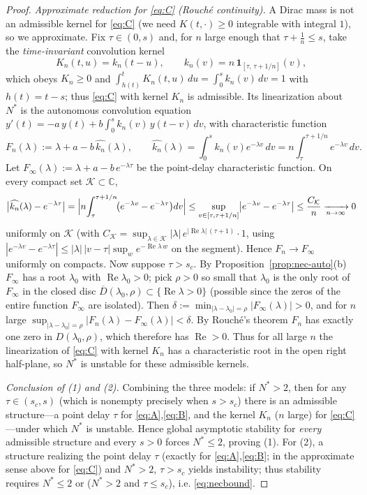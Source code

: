 \documentclass[12pt]{article}
\theoremstyle{definition}
\begin{document}
\begin{proof}
\emph{Approximate reduction for \eqref{eq:C} (Rouch\'e continuity).} A Dirac
mass is not an admissible kernel for \eqref{eq:C} (we need $K(t,\cdot)\ge0$
integrable with integral $1$), so we approximate. Fix $\tau\in(0,s)$ and, for
$n$ large enough that $\tau+\tfrac1n\le s$, take the \emph{time-invariant}
convolution kernel
\[
  K_n(t,u)=k_n(t-u),\qquad
  k_n(v)=n\,\mathbf 1_{[\tau,\,\tau+1/n]}(v),
\]
which obeys $K_n\ge0$ and $\int_{h(t)}^{t}K_n(t,u)\,du=\int_0^s k_n(v)\,dv=1$
with $h(t)=t-s$; thus \eqref{eq:C} with kernel $K_n$ is admissible. Its
linearization about $N^*$ is the autonomous convolution equation
$y'(t)=-a\,y(t)+b\!\int_0^s k_n(v)\,y(t-v)\,dv$, with characteristic function
\[
  F_n(\lambda):=\lambda+a-b\,\widehat{k_n}(\lambda),\qquad
  \widehat{k_n}(\lambda)=\int_0^s k_n(v)e^{-\lambda v}\,dv
  =n\!\int_{\tau}^{\tau+1/n}\! e^{-\lambda v}\,dv .
\]
Let $F_\infty(\lambda):=\lambda+a-b\,e^{-\lambda\tau}$ be the point-delay
characteristic function. On every compact set $\mathcal K\subset\mathbb C$,
\[
  \bigl|\widehat{k_n}(\lambda)-e^{-\lambda\tau}\bigr|
  =\Bigl|n\!\int_{\tau}^{\tau+1/n}\!\bigl(e^{-\lambda v}-e^{-\lambda\tau}\bigr)dv\Bigr|
  \le \sup_{v\in[\tau,\tau+1/n]}\bigl|e^{-\lambda v}-e^{-\lambda\tau}\bigr|
  \le \frac{C_{\mathcal K}}{n}\xrightarrow[n\to\infty]{}0
\]
uniformly on $\mathcal K$ (with $C_{\mathcal K}=\sup_{\lambda\in\mathcal K}
|\lambda|\,e^{|\operatorname{Re}\lambda|\,(\tau+1)}\cdot 1$, using
$|e^{-\lambda v}-e^{-\lambda\tau}|\le|\lambda|\,|v-\tau|\sup_{w}e^{-\operatorname{Re}\lambda\,w}$
on the segment). Hence $F_n\to F_\infty$ uniformly on compacts. Now suppose
$\tau>s_c$. By Proposition~\ref{prop:nec-auto}(b) $F_\infty$ has a root
$\lambda_0$ with $\operatorname{Re}\lambda_0>0$; pick $\rho>0$ so small that
$\lambda_0$ is the only root of $F_\infty$ in the closed disc
$\overline{D}(\lambda_0,\rho)\subset\{\operatorname{Re}\lambda>0\}$ (possible
since the zeros of the entire function $F_\infty$ are isolated). Then
$\delta:=\min_{|\lambda-\lambda_0|=\rho}|F_\infty(\lambda)|>0$, and for $n$ large
$\sup_{|\lambda-\lambda_0|=\rho}|F_n(\lambda)-F_\infty(\lambda)|<\delta$. By
Rouch\'e's theorem $F_n$ has exactly one zero in $D(\lambda_0,\rho)$, which
therefore has $\operatorname{Re}>0$. Thus for all large $n$ the linearization of
\eqref{eq:C} with kernel $K_n$ has a characteristic root in the open right
half-plane, so $N^*$ is unstable for these admissible kernels.

\emph{Conclusion of (1) and (2).} Combining the three models: if $N^*>2$, then
for any $\tau\in(s_c,s)$ (which is nonempty precisely when $s>s_c$) there is an
admissible structure—a point delay $\tau$ for \eqref{eq:A},\eqref{eq:B}, and the
kernel $K_n$ ($n$ large) for \eqref{eq:C}—under which $N^*$ is unstable. Hence
global asymptotic stability for \emph{every} admissible structure and every
$s>0$ forces $N^*\le2$, proving (1). For (2), a structure realizing the point
delay $\tau$ (exactly for \eqref{eq:A},\eqref{eq:B}; in the approximate sense
above for \eqref{eq:C}) and $N^*>2$, $\tau>s_c$ yields instability; thus
stability requires $N^*\le2$ or ($N^*>2$ and $\tau\le s_c$), i.e.
\eqref{eq:necbound}.
\end{proof}
\end{document}
